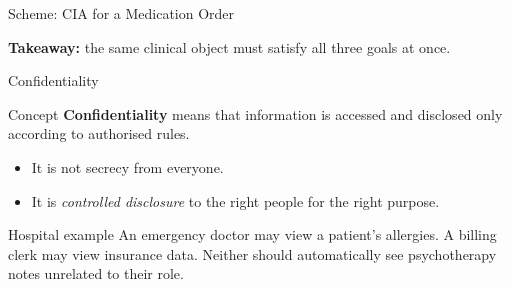 \documentclass[presentation]{beamer}
\begin{document}
\begin{frame}[c]{Scheme: CIA for a Medication Order}
\begin{center}
\end{center}

\smallskip
\centering
\textbf{Takeaway:} the same clinical object must satisfy all three goals at once.
\end{frame}

\begin{frame}[c]{Confidentiality}
\begin{block}{Concept}
\textbf{Confidentiality} means that information is accessed and disclosed only according to
authorised rules.
\end{block}

\begin{itemize}
    \item It is not secrecy from everyone.
    \item It is \textit{controlled disclosure} to the right people for the right purpose.
\end{itemize}

\begin{exampleblock}{Hospital example}
An emergency doctor may view a patient's allergies. A billing clerk may view insurance data.
Neither should automatically see psychotherapy notes unrelated to their role.
\end{exampleblock}
\end{frame}
\end{document}
